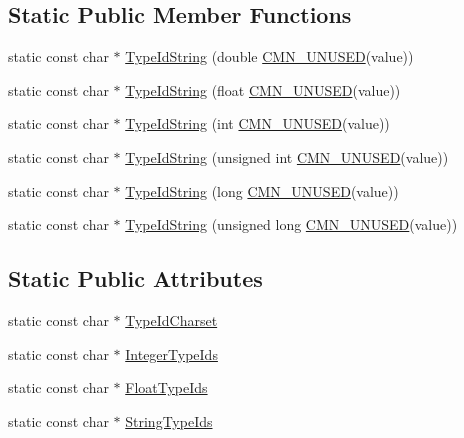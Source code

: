 \subsection*{Static Public Member Functions}
\begin{DoxyCompactItemize}
\item 
static const char $\ast$ \hyperlink{classcmn_printf_parser_a4f993a50dd44170213634a69ddb6f506}{Type\+Id\+String} (double \hyperlink{cmn_portability_8h_a021894e2626935fa2305434b1e893ff6}{C\+M\+N\+\_\+\+U\+N\+U\+S\+E\+D}(value))
\item 
static const char $\ast$ \hyperlink{classcmn_printf_parser_a1ffb0e3946131318695e296f2fe9ae83}{Type\+Id\+String} (float \hyperlink{cmn_portability_8h_a021894e2626935fa2305434b1e893ff6}{C\+M\+N\+\_\+\+U\+N\+U\+S\+E\+D}(value))
\item 
static const char $\ast$ \hyperlink{classcmn_printf_parser_a918ecad4cd9d270e4c665708ac6d466e}{Type\+Id\+String} (int \hyperlink{cmn_portability_8h_a021894e2626935fa2305434b1e893ff6}{C\+M\+N\+\_\+\+U\+N\+U\+S\+E\+D}(value))
\item 
static const char $\ast$ \hyperlink{classcmn_printf_parser_a9e8bf01b132585801476d15b086998cf}{Type\+Id\+String} (unsigned int \hyperlink{cmn_portability_8h_a021894e2626935fa2305434b1e893ff6}{C\+M\+N\+\_\+\+U\+N\+U\+S\+E\+D}(value))
\item 
static const char $\ast$ \hyperlink{classcmn_printf_parser_a0dfe34db38bc6607765f799ce84a71a7}{Type\+Id\+String} (long \hyperlink{cmn_portability_8h_a021894e2626935fa2305434b1e893ff6}{C\+M\+N\+\_\+\+U\+N\+U\+S\+E\+D}(value))
\item 
static const char $\ast$ \hyperlink{classcmn_printf_parser_a195baec1618d776f4283fbdb43715862}{Type\+Id\+String} (unsigned long \hyperlink{cmn_portability_8h_a021894e2626935fa2305434b1e893ff6}{C\+M\+N\+\_\+\+U\+N\+U\+S\+E\+D}(value))
\end{DoxyCompactItemize}
\subsection*{Static Public Attributes}
\begin{DoxyCompactItemize}
\item 
static const char $\ast$ \hyperlink{classcmn_printf_parser_aaa4ca685e67cabb8319f6c6e5b754517}{Type\+Id\+Charset}
\item 
static const char $\ast$ \hyperlink{classcmn_printf_parser_aa256066fc793a612014ac148e6f5c938}{Integer\+Type\+Ids}
\item 
static const char $\ast$ \hyperlink{classcmn_printf_parser_ad7f764cf8f7fbb64a10f1a817b417015}{Float\+Type\+Ids}
\item 
static const char $\ast$ \hyperlink{classcmn_printf_parser_a44131161d46cb41973c04e59722332f1}{String\+Type\+Ids}
\end{DoxyCompactItemize}


